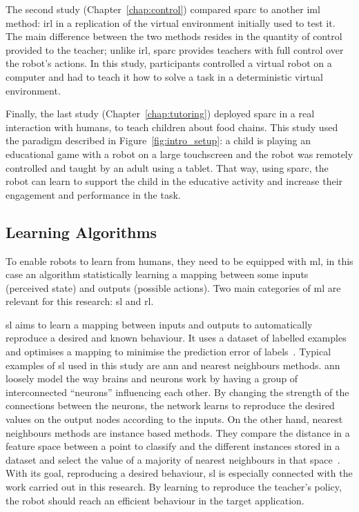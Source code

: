 The second study (Chapter~\ref{chap:control}) compared \gls{sparc} to another \gls{iml} method: \gls{irl} in a replication of the virtual environment initially used to test it. The main difference between the two methods resides in the quantity of control provided to the teacher; unlike \gls{irl}, \gls{sparc} provides teachers with full control over the robot's actions. In this study, participants controlled a virtual robot on a computer and had to teach it how to solve a task in a deterministic virtual environment.

Finally, the last study (Chapter~\ref{chap:tutoring}) deployed \gls{sparc} in a real interaction with humans, to teach children about food chains. This study used the paradigm described in Figure~\ref{fig:intro_setup}: a child is playing an educational game with a robot on a large touchscreen and the robot was remotely controlled and taught by an adult using a tablet. That way, using \gls{sparc}, the robot can learn to support the child in the educative activity and increase their engagement and performance in the task.

\subsection{Learning Algorithms}

To enable robots to learn from humans, they need to be equipped with \acrfull{ml}, in this case an algorithm statistically learning a mapping between some inputs (perceived state) and outputs (possible actions). Two main categories of \gls{ml} are relevant for this research: \gls{sl} and \gls{rl}.

\gls{sl} aims to learn a mapping between inputs and outputs to automatically reproduce a desired and known behaviour. It uses a dataset of labelled examples and optimises a mapping to minimise the prediction error of labels~\citep{russell2016artificial}. Typical examples of \gls{sl} used in this study are \gls{ann} and nearest neighbours methods. \gls{ann} loosely model the way brains and neurons work by having a group of interconnected ``neurons'' influencing each other. By changing the strength of the connections between the neurons, the network learns to reproduce the desired values on the output nodes according to the inputs. On the other hand, nearest neighbours methods are instance based methods. They compare the distance in a feature space between a point to classify and the different instances stored in a dataset and select the value of a majority of nearest neighbours in that space~\citep{cover1967nearest}. With its goal, reproducing a desired behaviour, \gls{sl} is especially connected with the work carried out in this research. By learning to reproduce the teacher's policy, the robot should reach an efficient behaviour in the target application.

